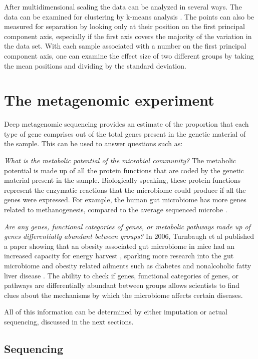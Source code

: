 After multidimensional scaling the data can be analyzed in several ways. The data can be examined for clustering by k-means analysis \cite{tibshirani2005cluster}. The points can also be measured for separation by looking only at their position on the first principal component axis, especially if the first axis covers the majority of the variation in the data set. With each sample associated with a number on the first principal component axis, one can examine the effect size of two different groups by taking the mean positions and dividing by the standard deviation.

\section{The metagenomic experiment}
Deep metagenomic sequencing provides an estimate of the proportion that each type of gene comprises out of the total genes present in the genetic material of the sample. This can be used to answer questions such as:

\textit{What is the metabolic potential of the microbial community?}
The metabolic potential is made up of all the protein functions that are coded by the genetic material present in the sample. Biologically speaking, these protein functions represent the enzymatic reactions that the microbiome could produce if all the genes were expressed. For example, the human gut microbiome has more genes related to methanogenesis, compared to the average sequenced microbe \cite{gill2006metagenomic}.

\textit{Are any genes, functional categories of genes, or metabolic pathways made up of genes differentially abundant between groups?}
In 2006, Turnbaugh et al published a paper showing that an obesity associated gut microbiome in mice had an increased capacity for energy harvest \cite{turnbaugh2006obesity}, sparking more research into the gut microbiome and obesity related ailments such as diabetes \cite{larsen2010gut} and nonalcoholic fatty liver disease \cite{zhu2013characterization}. The ability to check if genes, functional categories of genes, or pathways are differentially abundant between groups allows scientists to find clues about the mechanisms by which the microbiome affects certain diseases.

All of this information can be determined by either imputation or actual sequencing, discussed in the next sections.

\subsection{Sequencing}

